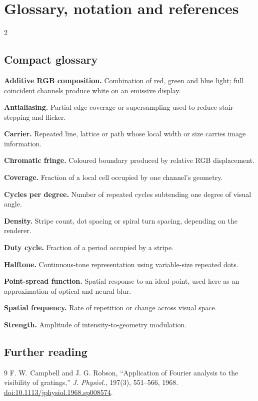 \section{Glossary, notation and references}

\begin{multicols}{2}
\subsection{Compact glossary}
\footnotesize
\textbf{Additive RGB composition.} Combination of red, green and blue light; full coincident channels produce white on an emissive display.

\textbf{Antialiasing.} Partial edge coverage or supersampling used to reduce stair-stepping and flicker.

\textbf{Carrier.} Repeated line, lattice or path whose local width or size carries image information.

\textbf{Chromatic fringe.} Coloured boundary produced by relative RGB displacement.

\textbf{Coverage.} Fraction of a local cell occupied by one channel's geometry.

\textbf{Cycles per degree.} Number of repeated cycles subtending one degree of visual angle.

\textbf{Density.} Stripe count, dot spacing or spiral turn spacing, depending on the renderer.

\textbf{Duty cycle.} Fraction of a period occupied by a stripe.

\textbf{Halftone.} Continuous-tone representation using variable-size repeated dots.

\textbf{Point-spread function.} Spatial response to an ideal point, used here as an approximation of optical and neural blur.

\textbf{Spatial frequency.} Rate of repetition or change across visual space.

\textbf{Strength.} Amplitude of intensity-to-geometry modulation.

\subsection{Further reading}
\begin{thebibliography}{9}
\footnotesize
{} F. W. Campbell and J. G. Robson, ``Application of Fourier analysis to the visibility of gratings,'' \emph{J. Physiol.}, 197(3), 551--566, 1968. \href{https://doi.org/10.1113/jphysiol.1968.sp008574}{doi:10.1113/jphysiol.1968.sp008574}.


\end{thebibliography}
\end{multicols}
